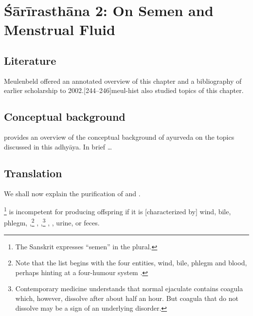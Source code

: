 
\chapter{Śārīrasthāna 2:  On Semen and Menstrual Fluid}


\section{Literature} 

Meulenbeld offered an annotated overview of this chapter and a bibliography
of earlier scholarship to 2002.[244--246]{meul-hist}  \citet[chs 
6--8]{das-2003} also studied topics of this chapter. 

\section{Conceptual background}


\citet[ch.\,13]{das-2003} provides an overview of the conceptual background of 
ayurveda on the topics discussed in this adhyāya.  In brief \ldots 

\section{Translation}

\begin{translation}
    
    \item [1] We shall now explain the purification of  and 
    .
    
    
    \item [3]  \footnote{The Sanskrit expresses
    “semen” in the plural.} is incompetent for producing offspring if it
    is [characterized by] wind, bile, phlegm, 
    ,\footnote{Note that the list begins with the four 
    entities, wind, bile, phlegm and blood, perhaps hinting at a four-humour 
    system \citep[see][485--486]{wuja-2000}.}
    ,
    ,\footnote{Contemporary medicine understands
        that normal ejaculate contains coagula which, however, dissolve after
        about half an hour.  But coagula that do not dissolve may be a sign
        of an underlying disorder.} ,
        , urine, or feces.
    
\end{translation}